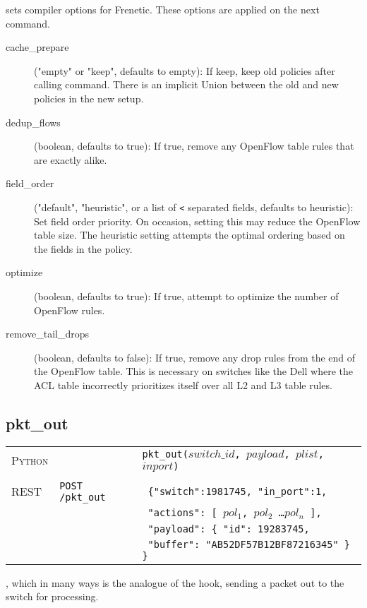  sets compiler options for Frenetic.  These options are applied on the next 
command.  

\begin{description}
\item[cache\_prepare] ("empty" or "keep", defaults to empty): If keep, keep old policies after calling  command.
There is an implicit Union between the old and new policies in the new setup.  
\item[dedup\_flows] (boolean, defaults to true): If true, remove any OpenFlow table rules that are exactly
alike.  
\item[field\_order] ("default", "heuristic", or a list of \texttt{<} separated fields, defaults to heuristic): 
  Set field order priority.  On occasion, setting this may reduce the OpenFlow table size.
  The heuristic setting attempts the optimal ordering based on the fields in the policy.
\item[optimize] (boolean, defaults to true): If true, attempt to optimize the number of OpenFlow rules.
\item[remove\_tail\_drops] (boolean, defaults to false): If true, remove any drop rules from the end of the
OpenFlow table.  This is necessary on switches like the Dell where the ACL table incorrectly prioritizes
itself over all L2 and L3 table rules.
\end{description}

\subsection{pkt\_out}

\bigskip
\begin{tabularx}{\linewidth}{llX}
\textsc{Python} &  & \texttt{pkt\_out($switch\_id$, $payload$, $plist$, $inport$)} \\ \\
\textsc{REST} & \texttt{POST /pkt\_out} & 
  \texttt{ \{"switch":1981745, "in\_port":1, } \\
  & & \texttt{ "actions": [ $pol_1$, $pol_2$ \ldots $pol_n$ ], } \\ 
  & & \texttt{ "payload": \{ "id": 19283745, }\\
  & & \texttt{ "buffer": "AB52DF57B12BF87216345" \} \} } 
\end{tabularx}

, which in many ways is the analogue of the  hook, sending a packet
out to the switch for processing. 

